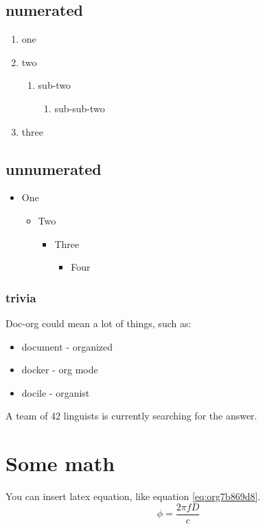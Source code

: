 \subsection{numerated}
\label{sec:org38335c4}
\begin{enumerate}
\item one
\item two
\begin{enumerate}
\item sub-two
\begin{enumerate}
\item sub-sub-two
\end{enumerate}
\end{enumerate}
\item three
\end{enumerate}

\subsection{unnumerated}
\label{sec:org549b463}
\begin{itemize}
\item One
\begin{itemize}
\item Two
\begin{itemize}
\item Three
\begin{itemize}
\item Four
\end{itemize}
\end{itemize}
\end{itemize}
\end{itemize}

\subsubsection{trivia}
\label{sec:org2587fe7}
Doc-org could mean a lot of things, such as:
\begin{itemize}
\item document - organized
\item docker - org mode
\item docile - organist
\end{itemize}
A team of 42 linguists is currently searching for the answer.

\section{Some math}
\label{sec:org5e221bb}
You can insert latex equation, like equation \ref{eq:org7b869d8}.
\begin{equation}
\label{eq:org7b869d8}
\phi = \frac{2\pi fD}{c}
\end{equation}

